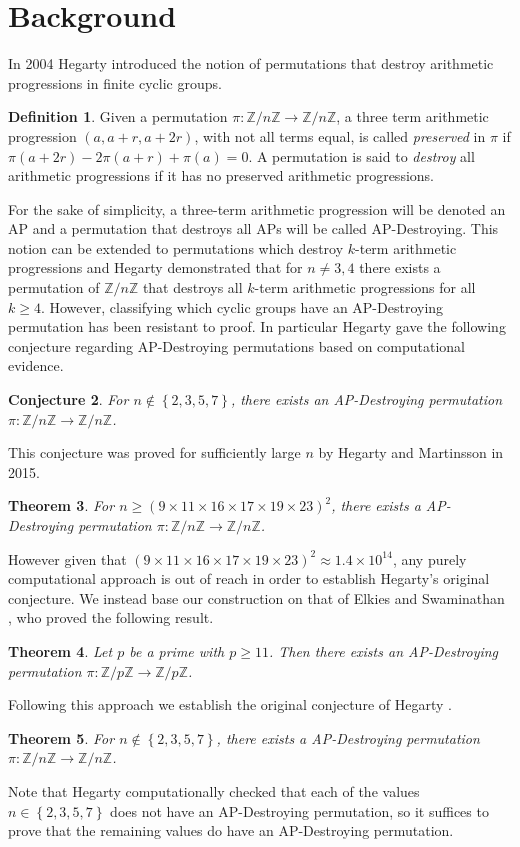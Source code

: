 \documentclass[12pt]{amsart}
\newtheorem{thm}{Theorem}
\newtheorem{conj}[thm]{Conjecture}
\theoremstyle{definition}
\newtheorem{defn}[thm]{Definition}
\theoremstyle{remark}
\newcommand{\Z}{\mathbb Z}
\begin{document}
\section{Background}
In 2004 Hegarty \cite{hegarty2004permutations} introduced the notion of permutations that destroy arithmetic progressions in finite cyclic groups.
\begin{defn}
Given a permutation $\pi:\Z/n\Z\to \Z/n\Z$, a three term arithmetic progression $(a, a+r, a+2r)$, with not all terms equal, is called \textit{preserved} in $\pi$ if $\pi(a+2r)-2\pi(a+r)+\pi(a)=0$. A permutation is said to \textit{destroy} all arithmetic progressions if it has no preserved arithmetic progressions.
\end{defn}
For the sake of simplicity, a three-term arithmetic progression will be denoted an AP and a permutation that destroys all APs will be called AP-Destroying. This notion can be extended to permutations which destroy $k$-term arithmetic progressions and Hegarty \cite{hegarty2004permutations} demonstrated that for $n\neq 3,4$ there exists a permutation of $\Z/n\Z$ that destroys all $k$-term arithmetic progressions for all $k\ge 4$. However, classifying which cyclic groups have an AP-Destroying permutation has been resistant to proof. In particular Hegarty \cite{hegarty2004permutations} gave the following conjecture regarding AP-Destroying permutations based on computational evidence.
\begin{conj}
For $n\not\in\left\{2,3,5,7\right\}$, there exists an AP-Destroying permutation $\pi:\Z/n\Z\to \Z/n\Z$.
\end{conj}
This conjecture was proved for sufficiently large $n$ by Hegarty and Martinsson \cite{hegarty2015permutations} in 2015.
\begin{thm}\label{current}
For $n\ge(9\times11\times16\times17\times19\times23)^2$, there exists a AP-Destroying permutation $\pi:\Z/n\Z\to \Z/n\Z$.
\end{thm}
However given that $(9\times11\times16\times17\times19\times23)^2\approx 1.4\times 10^{14}$, any purely computational approach is out of reach in order to establish Hegarty's original conjecture. We instead base our construction on that of Elkies and Swaminathan \cite{Ashvin}, who proved the following result.
\begin{thm}
Let $p$ be a prime with $p\ge 11$. Then there exists an AP-Destroying permutation $\pi:\Z/p\Z\to \Z/p\Z$.
\end{thm}
Following this approach we establish the original conjecture of Hegarty \cite{hegarty2004permutations}.
\begin{thm}\label{main}
For $n\not\in\left\{2,3,5,7\right\}$, there exists a AP-Destroying permutation $\pi:\Z/n\Z\to \Z/n\Z$.
\end{thm}
Note that Hegarty \cite{hegarty2004permutations} computationally checked that each of the values $n\in\left\{2,3,5,7\right\}$ does not have an AP-Destroying permutation, so it suffices to prove that the remaining values do have an AP-Destroying permutation.
\end{document}
